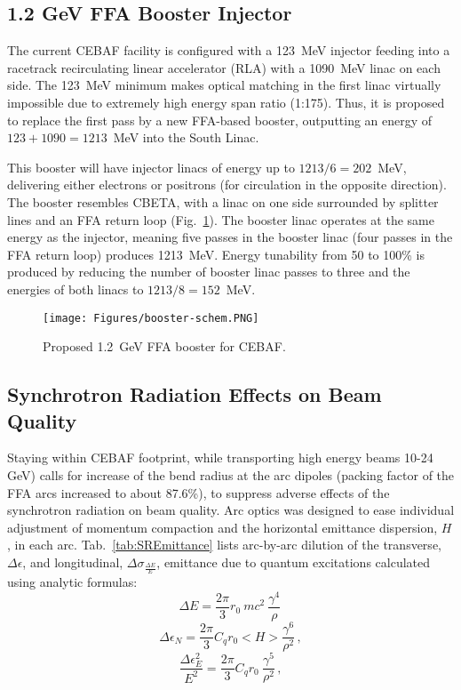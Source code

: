 \subsection{1.2 GeV FFA Booster Injector} %
The current CEBAF facility is configured with a 123~MeV injector feeding into a racetrack recirculating linear accelerator (RLA) with a 1090~MeV linac on each side.  The 123~MeV minimum makes optical matching in the first linac virtually impossible due to extremely high energy span ratio (1:175). Thus, it is proposed to replace the first pass by a new FFA-based booster, outputting an energy of $123+1090=1213$~MeV into the South Linac.

This booster will have injector linacs of energy up to $1213/6=202$~MeV, delivering either electrons or positrons (for circulation in the opposite direction).  The booster resembles CBETA, with a linac on one side surrounded by splitter lines and an FFA return loop (Fig.~\ref{fig:booster-schem}).  The booster linac operates at the same energy as the injector, meaning five passes in the booster linac (four passes in the FFA return loop) produces 1213~MeV.  Energy tunability from 50 to 100\% is produced by reducing the number of booster linac passes to three and the energies of both linacs to $1213/8=152$~MeV.  

\begin{figure}[htb]
  \centering
  \texttt{[image: Figures/booster-schem.PNG]}
  \caption{Proposed 1.2~GeV FFA booster for CEBAF.}
  \label{fig:booster-schem}
\end{figure}
%
\subsection{Synchrotron Radiation Effects on Beam Quality}
 Staying within CEBAF footprint, while transporting high energy beams 10-24 GeV) calls for increase of the bend radius at the arc dipoles (packing factor of  the FFA arcs increased to about 87.6\%), to suppress adverse effects of the synchrotron radiation on beam quality. Arc optics was designed to ease individual adjustment of momentum compaction and the horizontal emittance  dispersion, $H$, in each arc.
Tab.~\ref{tab:SREmittance} lists arc-by-arc dilution of the transverse, $\Delta \epsilon$, and longitudinal, $\Delta \sigma_{\frac{\Delta E}{E}}$, emittance due to quantum excitations calculated using analytic formulas:  
%
\begin{equation}
  \Delta E = \frac{2 \pi}{3} r_0 ~mc^2~ \frac{\gamma^4}{\rho}\,
  \label{eq:Emit_dil_1}
\end{equation}
%
\begin{equation}
  \Delta \epsilon_N = \frac{2 \pi}{3} C_q r_0 <H> \frac{\gamma^6}{\rho^2}\,,
  \label{eq:Emit_dil_2}
\end{equation}
%
\begin{equation}
  \frac{\Delta \epsilon_E^2}{E^2} = \frac{2 \pi}{3} C_q r_0~ \frac{\gamma^5}{\rho^2}\,,
  \label{eq:Emit_dil_3}
\end{equation}

